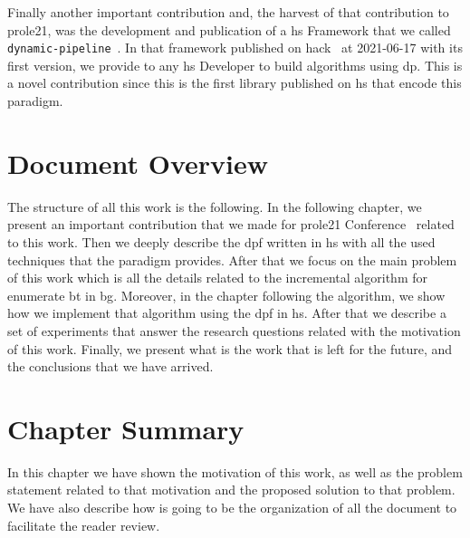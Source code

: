 Finally another important contribution and, the harvest of that contribution to \acrshort{prole21}, was the development and publication of a \acrshort{hs} Framework 
that we called \texttt{dynamic-pipeline}~\cite{dynamic-pipeline}. In that framework published on \acrfull{hack}~\cite{hackage} at 2021-06-17 with its first version,
we provide to any \acrshort{hs} Developer to build algorithms using \acrshort{dp}. This is a novel contribution since this is the first library published on \acrshort{hs}
that encode this paradigm.


\section{Document Overview}
The structure of all this work is the following. In the following chapter, we present an important contribution that we made for \acrshort{prole21} Conference~\cite{prole21} related to 
this work. Then we deeply describe the \acrshort{dpf} written in \acrshort{hs} with all the used techniques that the paradigm provides.
After that we focus on the main problem of this work which is all the details related to the incremental algorithm for enumerate \acrshort{bt} in \acrshort{bg}.
Moreover, in the chapter following the algorithm, we show how we implement that algorithm using the \acrshort{dpf} in \acrshort{hs}. After that we describe a set 
of experiments that answer the research questions related with the motivation of this work. Finally, we present what is the work that is left for the future, and the conclusions that
we have arrived.

\section{Chapter Summary}
In this chapter we have shown the motivation of this work, as well as the problem statement related to that motivation and the proposed solution to that problem.
We have also describe how is going to be the organization of all the document to facilitate the reader review.
